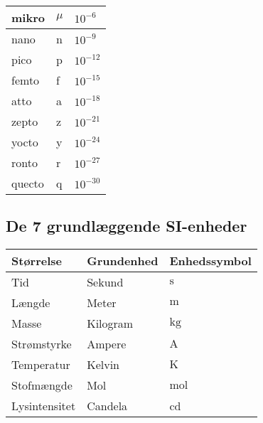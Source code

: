 \begin{table}[ht]
\begin{tabular}{|l|l|l|}
mikro                   & $\mu$                  & $10^{-6}$          \\ \hline
nano                    & n                      & $10^{-9}$          \\ \hline
pico                    & p                      & $10^{-12}$         \\ \hline
femto                   & f                      & $10^{-15}$         \\ \hline
atto                    & a                      & $10^{-18}$         \\ \hline
zepto                   & z                      & $10^{-21}$         \\ \hline
yocto                   & y                      & $10^{-24}$         \\ \hline
ronto                   & r                      & $10^{-27}$         \\ \hline
quecto                  & q                      & $10^{-30}$         \\ \hline
\end{tabular}
\end{table}

\subsection{De 7 grundlæggende SI-enheder}
\begin{table}[ht]
\begin{tabular}{|l|l|l|}
\hline
\textbf{Størrelse} & \textbf{Grundenhed} & \textbf{Enhedssymbol} \\ \hline
Tid                & Sekund              & $\unit{\second}$                     \\ \hline
Længde             & Meter               & $\unit{\meter}$                     \\ \hline
Masse              & Kilogram            & $\unit{\kilogram}$                    \\ \hline
Strømstyrke        & Ampere              & $\unit{\ampere}$                     \\ \hline
Temperatur         & Kelvin              & $\unit{\kelvin}$                     \\ \hline
Stofmængde         & Mol                 & $\unit{\mol}$                     \\ \hline
Lysintensitet      & Candela             & \unit{\candela}                    \\ \hline
\end{tabular}
\end{table}

